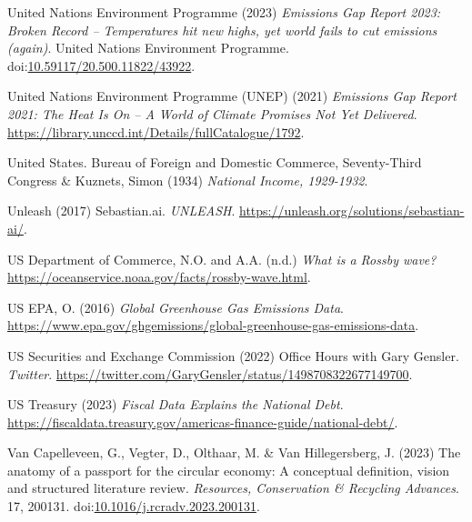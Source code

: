 \documentclass[
  letterpaper,
  DIV=11,
  numbers=noendperiod]{scrartcl}
\newlength{\cslhangindent}
\newenvironment{CSLReferences}[2] %
 {\begin{list}{}{%
  \setlength{\itemindent}{0pt}
  \setlength{\leftmargin}{0pt}
  \setlength{\parsep}{0pt}
  \ifodd #1
   \setlength{\leftmargin}{\cslhangindent}
   \setlength{\itemindent}{-1\cslhangindent}
  \fi
  \setlength{\itemsep}{#2\baselineskip}}}
 {\end{list}}
\begin{document}
\begin{CSLReferences}{0}{1}
United Nations Environment Programme (2023) \emph{Emissions {Gap Report}
2023: {Broken Record} -- {Temperatures} hit new highs, yet world fails
to cut emissions (again)}. United Nations Environment Programme.
doi:\href{https://doi.org/10.59117/20.500.11822/43922}{10.59117/20.500.11822/43922}.

United Nations Environment Programme (UNEP) (2021) \emph{Emissions {Gap
Report} 2021: {The Heat Is On} -- {A World} of {Climate Promises Not Yet
Delivered}}. \url{https://library.unccd.int/Details/fullCatalogue/1792}.

United States. Bureau of Foreign and Domestic Commerce, Seventy-Third
Congress \& Kuznets, Simon (1934) \emph{National {Income}, 1929-1932}.

Unleash (2017) Sebastian.ai. \emph{UNLEASH}.
\url{https://unleash.org/solutions/sebastian-ai/}.

US Department of Commerce, N.O. and A.A. (n.d.) \emph{What is a {Rossby}
wave?} \url{https://oceanservice.noaa.gov/facts/rossby-wave.html}.

US EPA, O. (2016) \emph{Global {Greenhouse Gas Emissions Data}}.
\url{https://www.epa.gov/ghgemissions/global-greenhouse-gas-emissions-data}.

US Securities and Exchange Commission (2022) Office {Hours} with {Gary
Gensler}. \emph{Twitter}.
\url{https://twitter.com/GaryGensler/status/1498708322677149700}.

US Treasury (2023) \emph{Fiscal {Data Explains} the {National Debt}}.
\url{https://fiscaldata.treasury.gov/americas-finance-guide/national-debt/}.

Van Capelleveen, G., Vegter, D., Olthaar, M. \& Van Hillegersberg, J.
(2023) The anatomy of a passport for the circular economy: A conceptual
definition, vision and structured literature review. \emph{Resources,
Conservation \& Recycling Advances}. 17, 200131.
doi:\href{https://doi.org/10.1016/j.rcradv.2023.200131}{10.1016/j.rcradv.2023.200131}.


\end{CSLReferences}
\end{document}
